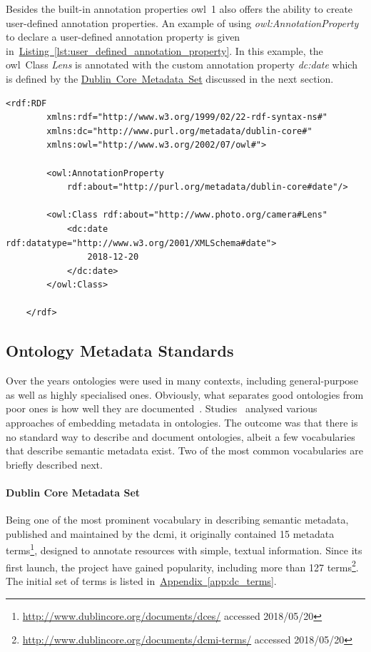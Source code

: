 Besides the built-in annotation properties \gls{owl}~1 also offers the ability to create user-defined annotation properties. An example of using \emph{owl:AnnotationProperty} to declare a user-defined annotation property is given in~\hyperref[lst:user_defined_annotation_property]{Listing~\ref*{lst:user_defined_annotation_property}}. In this example, the \gls{owl}~Class \emph{Lens} is annotated with the custom annotation property \emph{dc:date} which is defined by the \hyperref[sec:dublin_core_metadata_vocabulary]{Dublin~Core~Metadata~Set} discussed in the next section. 
\begin{lstlisting}[frame=single,caption=Declaration of user-defined annotation property in \gls{owl}~1,label=lst:user_defined_annotation_property]
	<rdf:RDF
		xmlns:rdf="http://www.w3.org/1999/02/22-rdf-syntax-ns#"
		xmlns:dc="http://www.purl.org/metadata/dublin-core#"
		xmlns:owl="http://www.w3.org/2002/07/owl#">
		
		<owl:AnnotationProperty 
			rdf:about="http://purl.org/metadata/dublin-core#date"/>
		
		<owl:Class rdf:about="http://www.photo.org/camera#Lens"
			<dc:date rdf:datatype="http://www.w3.org/2001/XMLSchema#date">
				2018-12-20
			</dc:date>
		</owl:Class>
		
	</rdf>
\end{lstlisting}

\subsection{Ontology Metadata Standards}\label{sec:ontology_metadata_standards}
Over the years ontologies were used in many contexts, including general-purpose as well as highly specialised ones. Obviously, what separates good ontologies from poor ones is how well they are documented~\cite{daquin2012}. Studies~\cite{dutta2017} analysed various approaches of embedding metadata in ontologies. The outcome was that there is no standard way to describe and document ontologies, albeit a few vocabularies that describe semantic metadata exist. Two of the most common vocabularies are briefly described next.

\paragraph{Dublin Core Metadata Set}\label{sec:dublin_core_metadata_vocabulary} Being one of the most prominent vocabulary in describing semantic metadata, published and maintained by the \gls{dcmi}, it originally contained 15 metadata terms\footnote{\url{http://www.dublincore.org/documents/dces/} accessed 2018/05/20},  designed to annotate resources with simple, textual information. Since its first launch, the project have gained popularity, including more than 127 terms\footnote{\url{http://www.dublincore.org/documents/dcmi-terms/} accessed 2018/05/20}. The initial set of terms is listed in~\hyperref[app:dc_terms]{Appendix~\ref*{app:dc_terms}}. 

